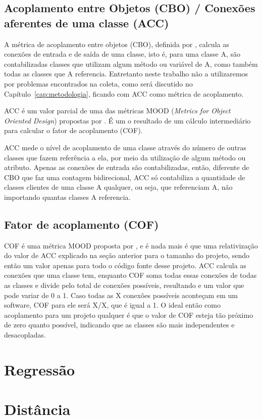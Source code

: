 \subsection{Acoplamento entre Objetos (CBO) / Conexões aferentes de uma classe (ACC)}

A métrica de acoplamento entre objetos (CBO), definida por , calcula as conexões de entrada e de saída de uma classe, isto é, para uma classe A, são contabilizadas classes que utilizam algum método ou variável de A, como também todas as classes que A referencia. Entretanto neste trabalho não a utilizaremos por problemas encontrados na coleta, como será discutido no Capítulo~\ref{cap:metodologia}, ficando com ACC como métrica de acoplamento.

ACC é um valor parcial de uma das métricas MOOD (\textit{Metrics for Object Oriented Design}) propostas por . É um o resultado de um cálculo intermediário para calcular o fator de acoplamento (COF). 

ACC mede o nível de acoplamento de uma classe através do número de outras classes que fazem referência a ela, por meio da utilização de algum método ou atributo. Apenas as conexões de entrada são contabilizadas, então, diferente de CBO que faz uma contagem bidirecional, ACC só contabiliza a quantidade de classes clientes de uma classe A qualquer, ou seja, que referenciam A, não importando quantas classes A referencia.

\subsection{Fator de acoplamento (COF)}

COF é uma métrica MOOD proposta por , e é nada mais é que uma relativização do valor de ACC explicado na seção anterior para o tamanho do projeto, sendo então um valor apenas para todo o código fonte desse projeto. ACC calcula as conexões que uma classe tem, enquanto COF soma todas essas conexões de todas as classes e divide pelo total de conexões possíveis, resultando e um valor que pode variar de 0 a 1. Caso todas as X conexões possíveis aconteçam em um software, COF para ele será X/X, que é igual a 1. O ideal então como acoplamento para um projeto qualquer é que o valor de COF esteja tão próximo de zero quanto possível, indicando que as classes são mais independentes e desacopladas.

\section{Regressão}
\section{Distância}
